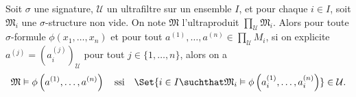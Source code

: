 \begin{theorem}\label{thm.Los}
	Soit $\sigma$ une signature, $\mathcal{U}$ un ultrafiltre sur un ensemble $I$, et pour chaque $i\in I$, soit $\mathfrak{M}_{i}$ une $\sigma$-structure non vide. On note $\mathfrak{M}$ l'ultraproduit $\prod_{\mathcal{U}}\mathfrak{M}_{i}$. Alors pour toute $\sigma$-formule $\phi\left(x_{1},\dots,x_{n}\right)$ et pour tout $a^{\left(1\right)},\dots,a^{\left(n\right)}\in\prod_{\mathcal{U}}M_{i}$, si on explicite $a^{\left(j\right)}=\left(a_{i}^{\left(j\right)}\right)_{\mathcal{U}}$ pour tout $j\in\{1,\dots,n\}$, alors on a
	\[
		\mathfrak{M}\vDash\phi\left(a^{\left(1\right)},\dots,a^{\left(n\right)}\right)\quad\text{ssi}\quad\Set{i\in I\suchthat\mathfrak{M}_{i}\vDash\phi\left(a_{i}^{\left(1\right)},\dots,a_{i}^{\left(n\right)}\right)}\in\mathcal{U}.
	\]
\end{theorem}

